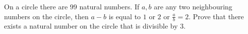 On a circle there are $99$ natural numbers. If $a,b$ are any two neighbouring numbers on the circle, then $a-b$ is equal to $1$ or $2$ or $\frac{a}{b}=2$. Prove that there exists a natural number on the circle that is divisible by $3$.